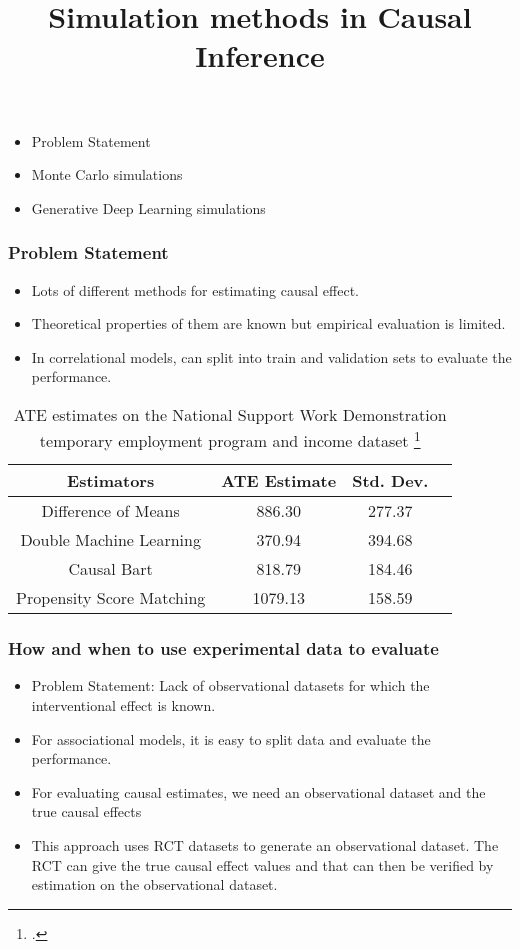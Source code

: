 \documentclass{beamer}
\begin{document}
\title{Simulation methods in Causal Inference}

\begin{frame}
	\begin{itemize}
		\item Problem Statement
		\item Monte Carlo simulations
		\item Generative Deep Learning simulations
	\end{itemize}
\end{frame}
\begin{frame}
	\frametitle{Problem Statement}
	\begin{itemize}
		\item Lots of different methods for estimating causal effect.
		\item Theoretical properties of them are known but empirical evaluation is limited.
		\item In correlational models, can split into train and validation sets to evaluate the performance.
	\end{itemize}
	\begin{table}[h!]
		\centering
		\begin{tabular}{||c c c c||} 
		 \hline
		 Estimators  & ATE Estimate & Std. Dev. \\ [0.5ex] 
		 \hline\hline
		 Difference of Means & 886.30 & 277.37 \\ 
		 Double Machine Learning & 370.94 & 394.68 \\
		 Causal Bart & 818.79 & 184.46 \\
		 Propensity Score Matching & 1079.13 & 158.59 \\ [1ex] 
		 \hline
		\end{tabular}
		\caption{ATE estimates on the National Support Work Demonstration temporary employment program and income dataset \footcite{parikh2022evaluating}}
		\label{table:1}
	\end{table}
\end{frame}

\begin{frame}
	\frametitle{How and when to use experimental data to evaluate}
	\begin{itemize}
		\item Problem Statement: Lack of observational datasets for which the interventional effect is known.
		\item For associational models, it is easy to split data and evaluate the performance.
		\item For evaluating causal estimates, we need an observational dataset and the true causal effects
		\item This approach uses RCT datasets to generate an observational dataset. The RCT can give the true causal effect values and that can then be verified by estimation on the observational dataset.
	\end{itemize}
\end{frame}
\end{document}
